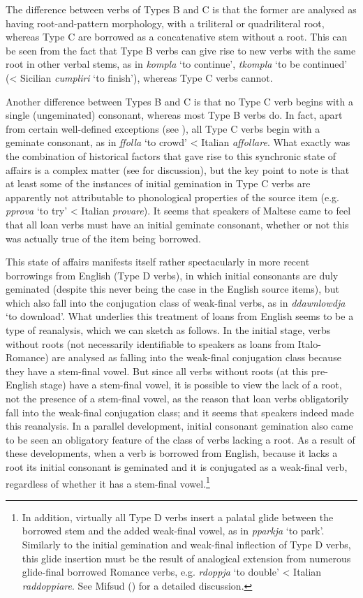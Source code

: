 \documentclass[output=paper]{langsci/langscibook}
\begin{document}
The difference between verbs of Types B and C is that the former are analysed as having root-and-pattern morphology, with a triliteral or quadriliteral root, whereas Type C are borrowed as a concatenative stem without a root. This can be seen from the fact that Type B verbs can give rise to new verbs with the same root in other verbal stems, as in \textit{kompla} `to continue', \textit{tkompla} `to be continued' (< Sicilian \textit{cumpliri} `to finish'), whereas Type C verbs cannot.

Another difference between Types B and C is that no Type C verb begins with a single (ungeminated) consonant, whereas most Type B verbs do. In fact, apart from certain well-defined exceptions (see \citealt[152]{mifsudloanverbs}), all Type C verbs begin with a geminate consonant, as in \textit{ffolla} `to crowd' < Italian \textit{affollare}. What exactly was the combination of historical factors that gave rise to this synchronic state of affairs is a complex matter (see \citealt[158--168]{mifsudloanverbs} for discussion), but the key point to note is that at least some of the instances of initial gemination in Type C verbs are apparently not attributable to phonological properties of the source item (e.g. \textit{pprova} `to try' < Italian \textit{provare}). It seems that speakers of Maltese came to feel that all loan verbs must have an initial geminate consonant, whether or not this was actually true of the item being borrowed.

This state of affairs manifests itself rather spectacularly in more recent borrowings from English (Type D verbs), in which initial consonants are duly geminated (despite this never being the case in the English source items), but which also fall into the conjugation class of weak-final verbs, as in \textit{ddawnlowdja} `to download'. What underlies this treatment of loans from English seems to be a type of reanalysis, which we can sketch as follows. In the initial stage, verbs without roots (not necessarily identifiable to speakers as loans from Italo-Romance) are analysed as falling into the weak-final conjugation class because they have a stem-final vowel. But since all verbs without roots (at this pre-English stage) have a stem-final vowel, it is possible to view the lack of a root, not the presence of a stem-final vowel, as the reason that loan verbs obligatorily fall into the weak-final conjugation class; and it seems that speakers indeed made this reanalysis. In a parallel development, initial consonant gemination also came to be seen an obligatory feature of the class of verbs lacking a root. As a result of these developments, when a verb is borrowed from English, because it lacks a root its initial consonant is geminated and it is conjugated as a weak-final verb, regardless of whether it has a stem-final vowel.\footnote{In addition, virtually all Type D verbs insert a palatal glide between the borrowed stem and the added weak-final vowel, as in \textit{pparkja} `to park'. Similarly to the initial gemination and weak-final inflection of Type D verbs, this glide insertion must be the result of analogical extension from numerous glide-final borrowed Romance verbs, e.g. \textit{rdoppja} `to double' < Italian \textit{raddoppiare}. See Mifsud (\citeyear[225--236]{mifsudloanverbs}) for a detailed discussion.}
\end{document}
